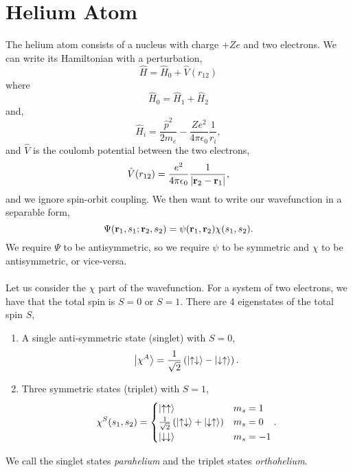 \documentclass{book}
\begin{document}
\section{Helium Atom}
The helium atom consists of a nucleus with charge $+Ze$ and two electrons. We can write its Hamiltonian with a perturbation,
\begin{equation}
	\hat{H} = \hat{H}_0 + \hat{V}(r_{12})
\end{equation}
where
\begin{equation}
	\hat{H}_0 = \hat{H}_1 + \hat{H}_2
\end{equation}
and,
\begin{equation}
	\hat{H}_i = \frac{\hat{p}^2}{2m_e} - \frac{Ze^2}{4\pi\epsilon_0}\frac{1}{r_i},
\end{equation}
and $\hat{V}$ is the coulomb potential between the two electrons,
\begin{equation}
	\hat{V}(r_{12}) = \frac{e^2}{4\pi\epsilon_0}\frac{1}{\abs{\vb{r}_2 - \vb{r}_1}},
\end{equation}
and we ignore spin-orbit coupling. We then want to write our wavefunction in a separable form,
\begin{equation}
	\Psi(\vb{r}_1,s_1;\vb{r}_2,s_2) = \psi(\vb{r}_1,\vb{r}_2)\chi(s_1,s_2).
\end{equation}
We require $\Psi$ to be antisymmetric, so we require $\psi$ to be symmetric and $\chi$ to be antisymmetric, or vice-versa.
\\\\
Let us consider the $\chi$ part of the wavefunction. For a system of two electrons, we have that the total spin is $S = 0$ or $S = 1$. There are 4 eigenstates of the total spin $S$,
\begin{enumerate}
	\item A single anti-symmetric state (singlet) with $S = 0$,
	\begin{equation}
		\ket{\chi^A} = \frac{1}{\sqrt{2}}\left(\ket{\uparrow\downarrow} - \ket{\downarrow\uparrow}\right).
	\end{equation}
	\item Three symmetric states (triplet) with $S = 1$,
	\begin{align}
		\chi^S(s_1,s_2) = \begin{cases}
			\ket{\uparrow\uparrow} & m_s = 1 \\
			\frac{1}{\sqrt{2}}\left(\ket{\uparrow\downarrow} + \ket{\downarrow\uparrow}\right) & m_s = 0 \\
			\ket{\downarrow\downarrow} & m_s = -1
		\end{cases}.
	\end{align}
\end{enumerate}
We call the singlet states \textit{parahelium} and the triplet states \textit{orthohelium}.
\end{document}
